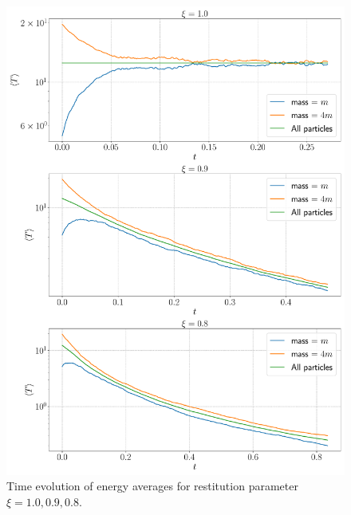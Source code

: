 \begin{figure}[htb]
	\centering
	\includegraphics[width = \columnwidth]{../fig/energy_avg.pdf}
	\caption{Time evolution of energy averages for restitution parameter $\xi = 1.0,0.9,0.8$.}
\end{figure}